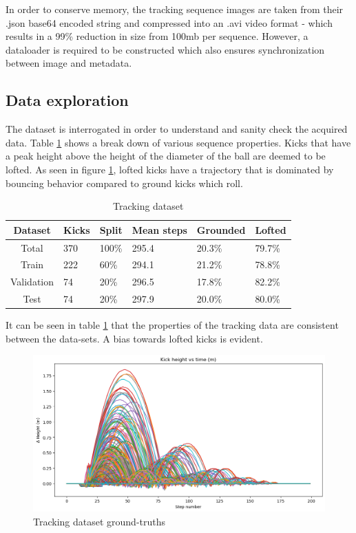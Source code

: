 \documentclass[a4paper,twoside,12pt]{report}
\begin{document}
In order to conserve memory, the tracking sequence images are taken from their .json base64 encoded string and compressed into an .avi video format - which results in a 99\% reduction in size from 100mb per sequence. However, a dataloader is required to be constructed which also ensures synchronization between image and metadata.

\subsection{Data exploration}

The dataset is interrogated in order to understand and sanity check the acquired data. Table \ref{tab:tracking} shows a break down of various sequence properties. Kicks that have a peak height above the height of the diameter of the ball are deemed to be lofted. As seen in figure \ref{fig:plotkicks}, lofted kicks have a trajectory that is dominated by bouncing behavior compared to ground kicks which roll.

\begin{table}[h!]
\fontsize{9.5pt}{12pt}\selectfont
\centering
\begin{tabular}{c|ll|l|ll}
{\bf Dataset}	&{\bf Kicks}	&{\bf Split}	&{\bf Mean steps}	&{\bf Grounded}	&{\bf Lofted}	\\\hline
Total			&370			&100\%			&295.4			&20.3\%			&79.7\%			\\\hline   
Train			&222			&60\%			&294.1			&21.2\%			&78.8\%			\\\hline  
Validation		&74				&20\%			&296.5			&17.8\%			&82.2\%			\\\hline  
Test			&74				&20\%			&297.9			&20.0\%			&80.0\%			\\\hline                        
\end{tabular}
\caption{Tracking dataset}
\label{tab:tracking}
\end{table}

It can be seen in table \ref{tab:tracking} that the properties of the tracking data are consistent between the data-sets. A bias towards lofted kicks is evident.

\begin{figure}[h!]
\begin{center}
\includegraphics[width=14cm]{images/plotkicks.png}
\caption{Tracking dataset ground-truths}
\label{fig:plotkicks}
\end{center}
\end{figure}
\end{document}

